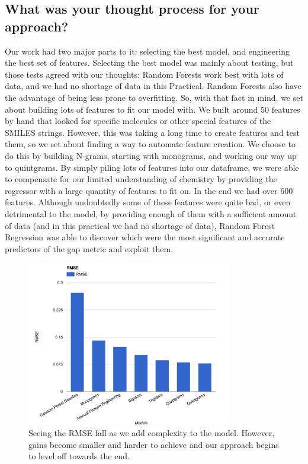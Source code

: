 \documentclass[]{article}
\begin{document}
\subsection*{What was your thought process for your approach?}
\begin{flushleft}
	Our work had two major parts to it: selecting the best model, and engineering the best set of features.  Selecting the best model was mainly about testing, but those tests agreed with our thoughts:  Random Forests work best with lots of data, and we had no shortage of data in this Practical.  
	\newline\newline
	Random Forests also have the advantage of being less prone to overfitting.  So, with that fact in mind, we set about building lots of features to fit our model with.  We built around 50 features by hand that looked for specific molecules or other special features of the SMILES strings.  However, this was taking a long time to create features and test them, so we set about finding a way to automate feature creation.  
	\newline\newline
	We choose to do this by building N-grams, starting with monograms, and working our way up to quintgrams.  By simply piling lots of features into our dataframe, we were able to compensate for our limited understanding of chemistry by providing the regressor with a large quantity of features to fit on.  In the end we had over 600 features.  Although undoubtedly some of these features were quite bad, or even detrimental to the model, by providing enough of them with a sufficient amount of data (and in this practical we had no shortage of data), Random Forest Regression was able to discover which were the most significant and accurate predictors of the gap metric and exploit them.
	\newline\newline
	\begin{figure}[h]
		\centering
		\includegraphics[width=0.8\textwidth]{RMSEperModel}
		\caption{Seeing the RMSE fall as we add complexity to the model.  However, gains become smaller and harder to achieve and our approach begins to level off towards the end.}
	\end{figure}
\end{flushleft}	
\newpage
\end{document}
